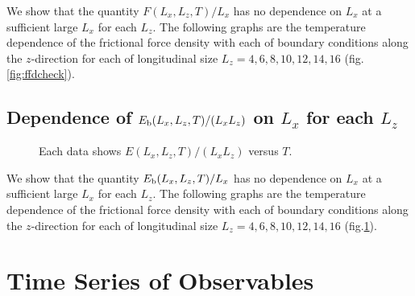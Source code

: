We show that the quantity $F(L_{x}, L_{z}, T)/L_{x}$ has no dependence on $L_{x}$ at a sufficient large $L_{x}$ for each $L_{z}$. The following graphs are the temperature dependence of the frictional force density with each of boundary conditions along the $z$-direction for each of longitudinal size $L_{z} = 4, 6, 8, 10, 12, 14, 16$ (fig.\ref{fig:ffdcheck}).

\subsection{Dependence of $E_{\rm b}(L_{x}, L_{z}, T)/(L_{x}L_{z})$ on $L_{x}$ for each $L_{z}$}

\begin{figure}[htbp]
	\centering
	
	
	
	\caption{Each data shows $E(L_{x}, L_{z}, T)/(L_{x}L_{z})$ versus $T$.}
	\label{fig:ebcheck}
\end{figure}

We show that the quantity $E_{\rm b}(L_{x}, L_{z}, T)/L_{x}$ has no dependence on $L_{x}$ at a sufficient large $L_{x}$ for each $L_{z}$. The following graphs are the temperature dependence of the frictional force density with each of boundary conditions along the $z$-direction for each of longitudinal size $L_{z} = 4, 6, 8, 10, 12, 14, 16$ (fig.\ref{fig:ebcheck}).



\section{Time Series of Observables}


